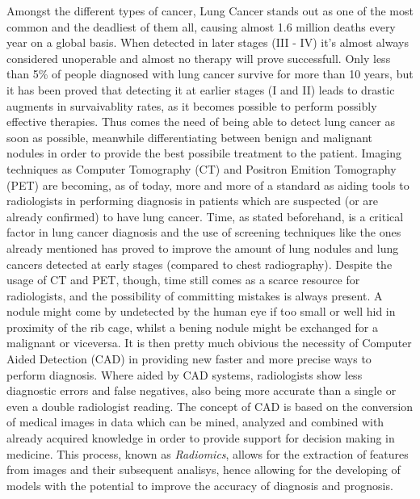\documentclass[../main.tex]{subfiles}
\begin{document}
\label{stateofart}
\thispagestyle{empty}

Amongst the different types of cancer, Lung Cancer stands out as one of the most common and the deadliest of them all, causing almost 1.6 million deaths every year on a global basis.\cite{Wasserman2015} When detected in later stages (III - IV) it's almost always considered unoperable and almost no therapy will prove successfull. Only less than 5\% of people diagnosed with lung cancer survive for more than 10 years, but it has been proved that detecting it at earlier stages (I and II) leads to drastic augments in survaivablity rates,\cite{CancerResearchUK} as it becomes possible to perform possibly effective therapies. Thus comes the need of being able to detect lung cancer as soon as possible, meanwhile differentiating between benign and malignant nodules in order to provide the best possibile treatment to the patient. Imaging techniques as Computer Tomography (CT) and Positron Emition Tomography (PET) are becoming, as of today, more and more of a standard as aiding tools to radiologists in performing diagnosis in patients which are suspected (or are already confirmed) to have lung cancer.\cite{Indicators2017} Time, as stated beforehand, is a critical factor in lung cancer diagnosis and the use of screening techniques like the ones already mentioned has proved to improve the amount of lung nodules and lung cancers detected at early stages (compared to chest radiography).\cite{AlMohammad2017} Despite the usage of CT and PET, though, time still comes as a scarce resource for radiologists, and the possibility of committing mistakes is always present. A nodule might come by undetected by the human eye if too small or well hid in proximity of the rib cage, whilst a bening nodule might be exchanged for a malignant or viceversa. It is then pretty much obivious the necessity of Computer Aided Detection (CAD) in providing new faster and more precise ways to perform diagnosis. Where aided by CAD systems, radiologists show less diagnostic errors and false negatives, also being more accurate than a single or even a double radiologist reading.\cite{AlMohammad2017} The concept of CAD is based on the conversion of medical images in data which can be mined, analyzed and combined with already acquired knowledge in order to provide support for decision making in medicine. This process, known as \textit{Radiomics}, allows for the extraction of features from images and their subsequent analisys, hence allowing for the developing of models with the potential to improve the accuracy of diagnosis and prognosis.\cite{Gillies2016} 
\vspace{5mm}
\end{document}
